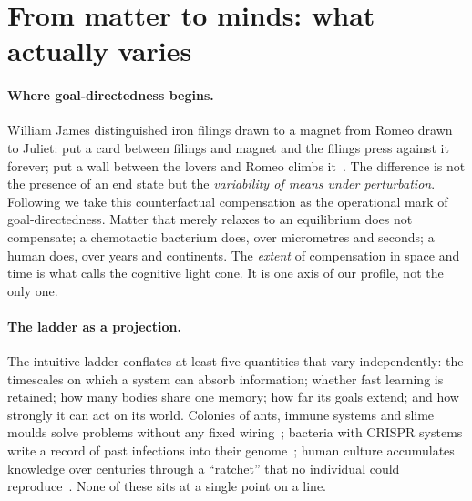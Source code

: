 \documentclass[11pt]{article}
\theoremstyle{plain}
\theoremstyle{definition}
\theoremstyle{remark}
\begin{document}
\section{From matter to minds: what actually varies}
\label{sec:ladder}

\paragraph{Where goal-directedness begins.}
William James distinguished iron filings drawn to a magnet from Romeo drawn to Juliet: put a card between filings and magnet and the filings press against it forever; put a wall between the lovers and Romeo climbs it~\citep{james1890principles}. The difference is not the presence of an end state but the \emph{variability of means under perturbation}. Following \citet{rosenblueth1943behavior} we take this counterfactual compensation as the operational mark of goal-directedness. Matter that merely relaxes to an equilibrium does not compensate; a chemotactic bacterium does, over micrometres and seconds; a human does, over years and continents. The \emph{extent} of compensation in space and time is what \citet{levin2019computational,levin2022tame} calls the cognitive light cone. It is one axis of our profile, not the only one.

\paragraph{The ladder as a projection.}
The intuitive ladder conflates at least five quantities that vary independently: the timescales on which a system can absorb information; whether fast learning is retained; how many bodies share one memory; how far its goals extend; and how strongly it can act on its world. Colonies of ants, immune systems and slime moulds solve problems without any fixed wiring~\citep{sole2019liquid,nakagaki2000maze}; bacteria with CRISPR systems write a record of past infections into their genome~\citep{barrangou2007crispr}; human culture accumulates knowledge over centuries through a ``ratchet'' that no individual could reproduce~\citep{tomasello1999cultural,boyd1985culture,henrich2016secret}. None of these sits at a single point on a line.
\end{document}
